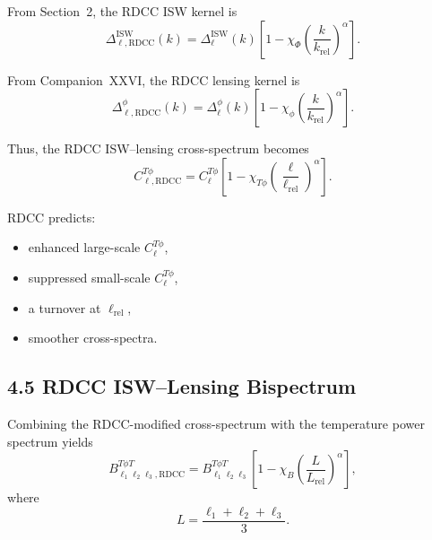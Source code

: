 \documentclass[11pt,a4paper]{article}
\begin{document}
From Section~2, the RDCC ISW kernel is
\begin{equation}
    \Delta_{\ell,\mathrm{RDCC}}^{\mathrm{ISW}}(k)
    = \Delta_{\ell}^{\mathrm{ISW}}(k)
      \left[
        1 - \chi_{\Phi}
        \left(\frac{k}{k_{\mathrm{rel}}}\right)^{\alpha}
      \right].
\end{equation}

From Companion~XXVI, the RDCC lensing kernel is
\begin{equation}
    \Delta_{\ell,\mathrm{RDCC}}^{\phi}(k)
    = \Delta_{\ell}^{\phi}(k)
      \left[
        1 - \chi_{\phi}
        \left(\frac{k}{k_{\mathrm{rel}}}\right)^{\alpha}
      \right].
\end{equation}

Thus, the RDCC ISW–lensing cross-spectrum becomes
\begin{equation}
    C_{\ell,\mathrm{RDCC}}^{T\phi}
    = C_{\ell}^{T\phi}
      \left[
        1 - \chi_{T\phi}
        \left(\frac{\ell}{\ell_{\mathrm{rel}}}\right)^{\alpha}
      \right].
\end{equation}

RDCC predicts:

\begin{itemize}
    \item enhanced large-scale $C_{\ell}^{T\phi}$,
    \item suppressed small-scale $C_{\ell}^{T\phi}$,
    \item a turnover at $\ell_{\mathrm{rel}}$,
    \item smoother cross-spectra.
\end{itemize}

\subsection*{4.5 RDCC ISW–Lensing Bispectrum}

Combining the RDCC-modified cross-spectrum with the temperature power spectrum yields
\begin{equation}
    B_{\ell_{1}\ell_{2}\ell_{3},\mathrm{RDCC}}^{T\phi T}
    = B_{\ell_{1}\ell_{2}\ell_{3}}^{T\phi T}
      \left[
        1 - \chi_{B}
        \left(\frac{L}{L_{\mathrm{rel}}}\right)^{\alpha}
      \right],
\end{equation}
where
\begin{equation}
    L = \frac{\ell_{1}+\ell_{2}+\ell_{3}}{3}.
\end{equation}
\end{document}

